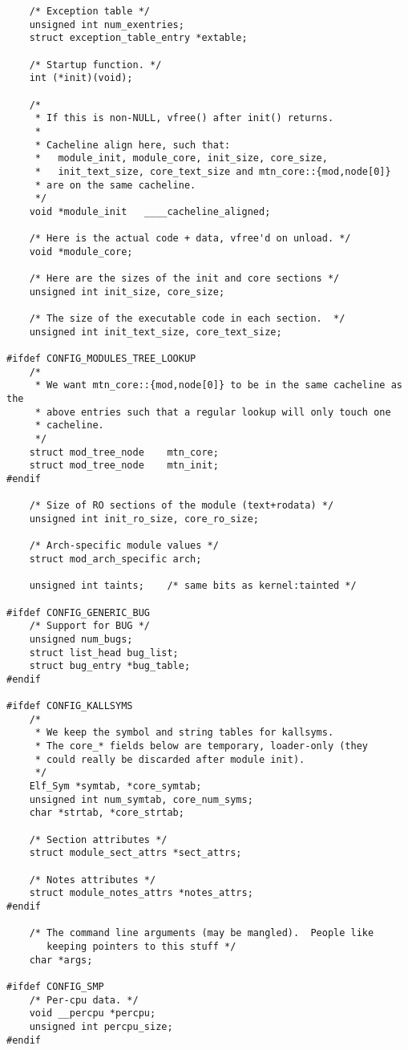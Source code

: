 \begin{lstlisting}
	/* Exception table */
	unsigned int num_exentries;
	struct exception_table_entry *extable;

	/* Startup function. */
	int (*init)(void);

	/*
	 * If this is non-NULL, vfree() after init() returns.
	 *
	 * Cacheline align here, such that:
	 *   module_init, module_core, init_size, core_size,
	 *   init_text_size, core_text_size and mtn_core::{mod,node[0]}
	 * are on the same cacheline.
	 */
	void *module_init	____cacheline_aligned;

	/* Here is the actual code + data, vfree'd on unload. */
	void *module_core;

	/* Here are the sizes of the init and core sections */
	unsigned int init_size, core_size;

	/* The size of the executable code in each section.  */
	unsigned int init_text_size, core_text_size;

#ifdef CONFIG_MODULES_TREE_LOOKUP
	/*
	 * We want mtn_core::{mod,node[0]} to be in the same cacheline as the
	 * above entries such that a regular lookup will only touch one
	 * cacheline.
	 */
	struct mod_tree_node	mtn_core;
	struct mod_tree_node	mtn_init;
#endif

	/* Size of RO sections of the module (text+rodata) */
	unsigned int init_ro_size, core_ro_size;

	/* Arch-specific module values */
	struct mod_arch_specific arch;

	unsigned int taints;	/* same bits as kernel:tainted */

#ifdef CONFIG_GENERIC_BUG
	/* Support for BUG */
	unsigned num_bugs;
	struct list_head bug_list;
	struct bug_entry *bug_table;
#endif

#ifdef CONFIG_KALLSYMS
	/*
	 * We keep the symbol and string tables for kallsyms.
	 * The core_* fields below are temporary, loader-only (they
	 * could really be discarded after module init).
	 */
	Elf_Sym *symtab, *core_symtab;
	unsigned int num_symtab, core_num_syms;
	char *strtab, *core_strtab;

	/* Section attributes */
	struct module_sect_attrs *sect_attrs;

	/* Notes attributes */
	struct module_notes_attrs *notes_attrs;
#endif

	/* The command line arguments (may be mangled).  People like
	   keeping pointers to this stuff */
	char *args;

#ifdef CONFIG_SMP
	/* Per-cpu data. */
	void __percpu *percpu;
	unsigned int percpu_size;
#endif


\end{lstlisting}
